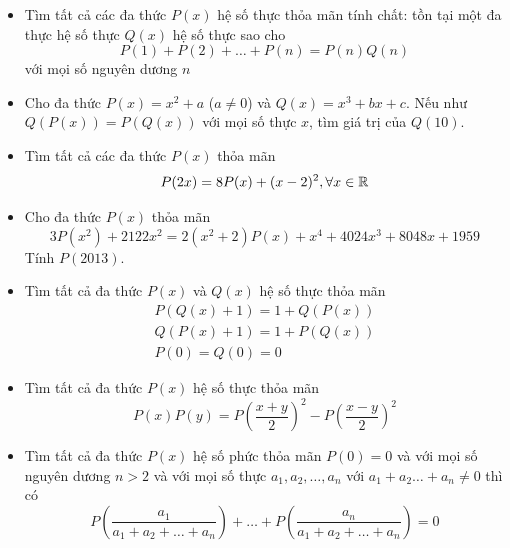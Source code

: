 \documentclass[11pt]{scrartcl}
\begin{document}
\begin{itemize}[label=, leftmargin=0em, itemsep=-0em]
        \item \begin{btvn}
            Tìm tất cả các đa thức $P(x)$ hệ số thực thỏa mãn tính chất: tồn tại một đa thực hệ số thực $Q(x)$ hệ số thực sao cho
            \[
                P(1) + P(2) + \dots + P(n) = P(n)Q(n)
            \]
            với mọi số nguyên dương $n$
        \end{btvn}

        \item \begin{btvn}
            Cho đa thức $P(x) = x^2 + a$ ($a \neq 0$) và $Q(x) = x^3 + bx + c$. Nếu như $Q(P(x)) = P(Q(x))$ với mọi số thực $x$, tìm giá trị của $Q(10)$.
        \end{btvn}

        \item \begin{btvn}
            Tìm tất cả các đa thức $P(x)$ thỏa mãn
            \[P(2x) = 8P(x) + (x - 2)^2, \forall x \in \mathbb{R}\]
        \end{btvn}

        \item \begin{btvn}
            Cho đa thức $P(x)$ thỏa mãn
            \[
                3P(x^2) + 2122x^2 = 2(x^2 + 2)P(x) + x^4 + 4024x^3 + 8048x + 1959
            \]
            Tính $P(2013)$.
        \end{btvn}

        \item \begin{btvn}
            Tìm tất cả đa thức $P(x)$ và $Q(x)$ hệ số thực thỏa mãn
            $$
            \begin{gathered}
            P(Q(x)+1)=1+Q(P(x)) \\
            Q(P(x)+1)=1+P(Q(x)) \\
            P(0)=Q(0)=0
            \end{gathered}
            $$
        \end{btvn}

        \item \begin{btvn}
            Tìm tất cả đa thức $P(x)$ hệ số thực thỏa mãn
            $$
            P(x) P(y)=P\left(\frac{x+y}{2}\right)^2-P\left(\frac{x-y}{2}\right)^2
            $$
        \end{btvn}

        \item \begin{btvn}
            Tìm tất cả đa thức $P(x)$ hệ số phức thỏa mãn $P(0)=0$ và với mọi số nguyên dương $n>2$ và với mọi số thực $a_1, a_2, \ldots, a_n$ với $a_1+a_2 \ldots+a_n \neq 0$ thì có
                $$
                P\left(\frac{a_1}{a_1+a_2+\ldots+a_n}\right)+\ldots+P\left(\frac{a_n}{a_1+a_2+\ldots+a_n}\right)=0
                $$
        \end{btvn}


\end{itemize}
\end{document}
